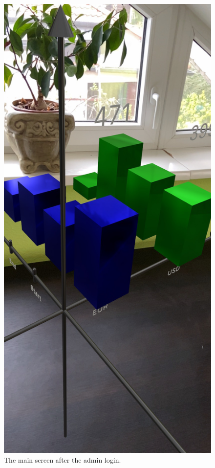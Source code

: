 \documentclass[11pt,a4paper,oneside]{report}
\begin{document}
\begin{figure}[!ht]
  \centering
  \includegraphics[scale=0.2]{top.jpeg}
  \caption{The main screen after the admin login.}
  \label{fig:TexnicCenter}
\end{figure}
\end{document}
